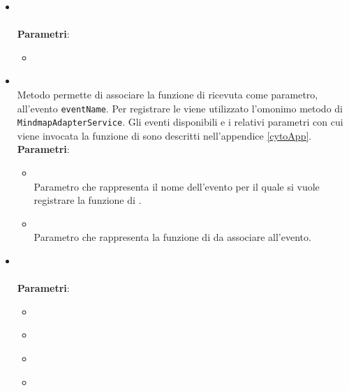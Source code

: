 \begin{itemize}
\begin{itemize}
\item {}
\\ \dpHandleError
\\ \textbf{Parametri}:
\begin{itemize}
\item {}
\\ \dpResponseParam
\end{itemize}
\item {}
\\ Metodo permette di associare la funzione di  ricevuta come parametro, all'evento \texttt{eventName}. Per registrare le  viene utilizzato l'omonimo metodo di \texttt{MindmapAdapterService}.
Gli eventi disponibili e i relativi parametri con cui viene invocata la funzione di  sono descritti nell'appendice \ref{cytoApp}.
\\ \textbf{Parametri}:
\begin{itemize}
\item {}
\\ Parametro che rappresenta il nome dell'evento per il quale si vuole registrare la funzione di .
\item {}
\\ Parametro che rappresenta la funzione di  da associare all'evento.
\end{itemize}
\item {}
\\ \dpConstructor
\\ \textbf{Parametri}:
\begin{itemize}
\item {}
\\ \dpQParam
\item {}
\\ \dpHttpParam
\item {}
\\ \dpMindMapServiceParam
\item {}
\\ \dpProjectServiceParam

\end{itemize}
\end{itemize}
\end{itemize}
